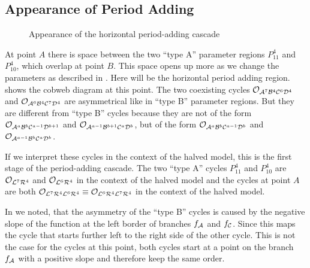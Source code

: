 \subsection{Appearance of Period Adding}

\begin{figure}
    \centering
    \caption{Appearance of the horizontal period-adding cascade}
\end{figure}

At point $A$ there is space between the two ``type A'' parameter regions $P_{11}^{4}$ and $P_{10}^{4}$, which overlap at point $B$.
This space opens up more as we change the parameters as described in .
Here will be the horizontal period adding region.
 shows the cobweb diagram at this point.
The two coexisting cycles $\mathcal{O}_{\mathcal{A}^7\mathcal{B}^4\mathcal{C}^6\mathcal{D}^4}$ and $\mathcal{O}_{\mathcal{A}^6\mathcal{B}^4\mathcal{C}^7\mathcal{D}^4}$ are asymmetrical like in ``type B'' parameter regions.
But they are different from ``type B'' cycles because they are not of the form $\mathcal{O}_{\mathcal{A}^a\mathcal{B}^b\mathcal{C}^{a-1}\mathcal{D}^{b+1}}$ and $\mathcal{O}_{\mathcal{A}^{a-1}\mathcal{B}^{b+1}\mathcal{C}^a\mathcal{D}^b}$, but of the form $\mathcal{O}_{\mathcal{A}^a\mathcal{B}^b\mathcal{C}^{a-1}\mathcal{D}^b}$ and $\mathcal{O}_{\mathcal{A}^{a-1}\mathcal{B}^b\mathcal{C}^a\mathcal{D}^b}$.

If we interpret these cycles in the context of the halved model, this is the first stage of the period-adding cascade.
The two ``type A'' cycles $P_{11}^4$ and $P_{10}^4$ are $\mathcal{O}_{\mathcal{L}^7\mathcal{R}^4}$ and $\mathcal{O}_{\mathcal{L}^6\mathcal{R}^4}$ in the context of the halved model and the cycles at point $A$ are both $\mathcal{O}_{\mathcal{L}^7\mathcal{R}^4\mathcal{L}^6\mathcal{R}^4} \equiv \mathcal{O}_{\mathcal{L}^6\mathcal{R}^4\mathcal{L}^7\mathcal{R}^4}$ in the context of the halved model.

In  we noted, that the asymmetry of the ``type B'' cycles is caused by the negative slope of the function at the left border of branches $f_{\mathcal{A}}$ and $f_{\mathcal{C}}$.
Since this maps the cycle that starts further left to the right side of the other cycle.
This is not the case for the cycles at this point, both cycles start at a point on the branch $f_{\mathcal{A}}$ with a positive slope and therefore keep the same order.


